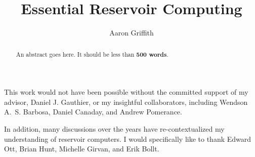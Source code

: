\documentclass[11pt,draft,phd]{osudiss-2}
\title{Essential Reservoir Computing}
\author{Aaron Griffith}
\begin{document}
\frontmatter

\begin{abstract}
  An abstract goes here. It should be less than \textbf{500 words}.
\end{abstract}

\dedication{For my parents Gregory and Mary Lea, and my brother Nathan.}

\begin{acknowledgments}
  This work would not have been possible without the committed support
  of my advisor, Daniel J. Gauthier, or my insightful collaborators,
  including Wendson A.~S. Barbosa, Daniel Canaday, and Andrew
  Pomerance.

  In addition, many discussions over the years have
  re-contextualized my understanding of reservoir computers. I would
  specifically like to thank Edward Ott, Brian Hunt, Michelle Girvan,
  and Erik Bollt.
\end{acknowledgments}

\begin{vita}

  \begin{publist}
  \end{publist}

  \begin{fieldsstudy}
  \end{fieldsstudy}
\end{vita}

\tableofcontents 

\clearpage
\listoffigures 

\clearpage
\listoftables 


\mainmatter





%


\backmatter
\nocite{*} %


%
%
\end{document}
